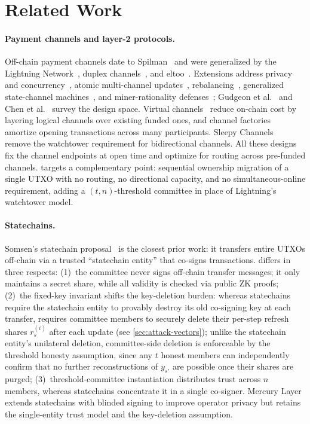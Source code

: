 \section{Related Work}\label{sec:related}

\paragraph{Payment channels and layer-2 protocols.}
Off-chain payment channels date to Spilman~\cite{spilman2013} and were generalized by the Lightning Network~\cite{poon2016lightning}, duplex channels~\cite{decker2015fast}, and eltoo~\cite{decker2018eltoo}. Extensions address privacy and concurrency~\cite{malavolta2017concurrency}, atomic multi-channel updates~\cite{egger2019atomic}, rebalancing~\cite{khalil2017revive}, generalized state-channel machines~\cite{miller2019sprites}, and miner-rationality defenses~\cite{aumayr2024securing}; Gudgeon et al.~\cite{gudgeon2020sok} and Chen et al.~\cite{chen2025pcnsurvey} survey the design space. Virtual channels~\cite{dziembowski2018virtual, aumayr2021bitcoin, aumayr2023donner} reduce on-chain cost by layering logical channels over existing funded ones, and channel factories~\cite{burchert2018scalable} amortize opening transactions across many participants. Sleepy Channels~\cite{thyagarajan2022sleepy} remove the watchtower requirement for bidirectional channels. All these designs fix the channel endpoints at open time and optimize for routing across pre-funded channels. \thunderbolt targets a complementary point: sequential ownership migration of a single UTXO with no routing, no directional capacity, and no simultaneous-online requirement, adding a $(t,n)$-threshold committee in place of Lightning's watchtower model.

\paragraph{Statechains.}
Somsen's statechain proposal~\cite{somsen2020statechains} is the closest prior work: it transfers entire UTXOs off-chain via a trusted ``statechain entity'' that co-signs transactions. \thunderbolt differs in three respects: (1)~the committee never signs off-chain transfer messages; it only maintains a secret share, while all validity is checked via public ZK proofs; (2)~the fixed-key invariant shifts the key-deletion burden: whereas statechains require the statechain entity to provably destroy its old co-signing key at each transfer, \thunderbolt requires committee members to securely delete their per-step refresh shares $r_s^{(i)}$ after each update (see \autoref{sec:attack-vectors}); unlike the statechain entity's unilateral deletion, committee-side deletion is enforceable by the threshold honesty assumption, since any $t$ honest members can independently confirm that no further reconstructions of $y_{s'}$ are possible once their shares are purged; (3)~threshold-committee instantiation distributes trust across $n$ members, whereas statechains concentrate it in a single co-signer. Mercury Layer~\cite{mercurylayer} extends statechains with blinded signing to improve operator privacy but retains the single-entity trust model and the key-deletion assumption.

